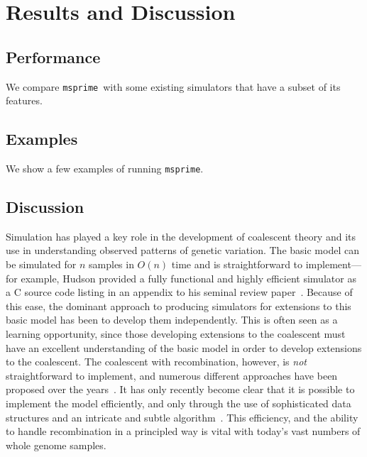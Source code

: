 \documentclass{article}
\newcommand{\msprime}[0]{\texttt{msprime}}
\newcommand{\msprime}[0]{{\texttt{msprime} }}
\begin{document}

\section*{Results and Discussion}
\subsection*{Performance}
We compare \msprime\ with some existing simulators that have a subset of its
features.


\subsection*{Examples}
We show a few examples of running \msprime.

\subsection*{Discussion}
Simulation has played a key role in the development of coalescent theory
and its use in understanding observed patterns of genetic variation.
The basic model can be simulated for $n$ samples in $O(n)$ time
and is straightforward to implement---for example, Hudson provided a fully
functional and highly efficient simulator as a C source code listing in an
appendix to his seminal review paper~\citep{hudson1990gene}. Because of
this ease, the dominant approach to producing simulators for extensions
to this basic model has been to develop them independently. This is
often seen as a learning opportunity, since those developing extensions
to the coalescent must have an excellent understanding of the basic
model in order to develop extensions to the coalescent.
The coalescent with recombination, however, is \emph{not} straightforward
to implement, and numerous different approaches have been
proposed over the
years~\citep{hudson1983properties,griffiths1997ancestral,wiuf1999recombination,
mcvean2005approximating}. It has only recently become clear that it is
possible to implement the model efficiently, and only through the use
of sophisticated data structures and an intricate and subtle
algorithm~\citep{kelleher2016efficient}.
This efficiency, and the ability to handle recombination in a principled
way is vital with today's vast numbers of whole genome samples.
\end{document}
